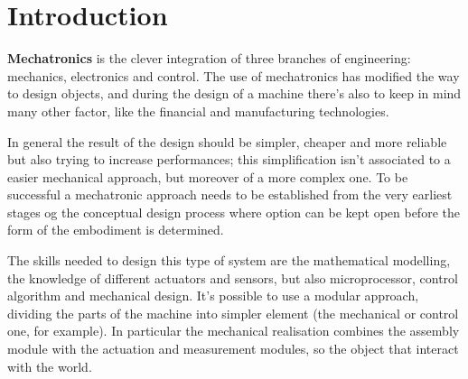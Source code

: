 \chapter{Introduction}
	\textbf{Mechatronics} is the clever integration of three branches of engineering: mechanics, electronics and control. The use of mechatronics has modified the way to design objects, and during the design of a machine there's also to keep in mind many other factor, like the financial and manufacturing technologies.
	
	In general the result of the design should be simpler, cheaper and more reliable but also trying to increase performances; this simplification isn't associated to a easier mechanical approach, but moreover of a more complex one. To be successful a mechatronic approach needs to be established from the very earliest stages og the conceptual design process where option can be kept open before the form of the embodiment is determined.
	
	The skills needed to design this type of system are the mathematical modelling, the knowledge of different actuators and sensors, but also microprocessor, control algorithm and mechanical design. It's possible to use a modular approach, dividing the parts of the machine into simpler element (the mechanical or control one, for example). In particular the mechanical realisation combines the assembly module with the actuation and measurement modules, so the object that interact with the world.